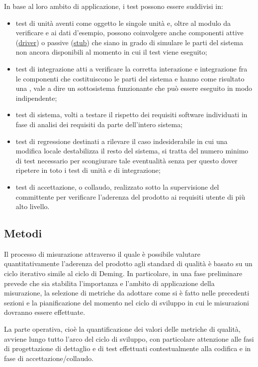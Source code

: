 In base al loro ambito di applicazione, i test possono essere suddivisi in:
\begin {itemize}
\item test di unità aventi come oggetto le singole unità e, oltre al modulo da verificare e ai dati d'esempio, possono coinvolgere anche componenti attive (\underline{driver}) o passive (\underline{stub}) che siano in grado di simulare le parti del sistema non ancora disponibili al momento in cui il test viene eseguito;

\item test di integrazione atti a verificare la corretta interazione e integrazione fra le componenti che costituiscono le parti del sistema e hanno come risultato una , vale a dire un sottosistema funzionante che può essere eseguito in modo indipendente;

\item test di sistema, volti a testare il rispetto dei requisiti software individuati in fase di analisi dei requisiti da parte dell'intero sistema;

\item test di regressione destinati a rilevare il caso indesiderabile in cui una modifica locale destabilizza il resto del sistema, si tratta del numero minimo di test necessario per scongiurare tale eventualità senza per questo dover ripetere in toto i test di unità e di integrazione;

\item test di accettazione, o collaudo, realizzato sotto la supervisione del committente per verificare l'aderenza del prodotto ai requisiti utente di più alto livello.

\end{itemize}

\subsection{Metodi}
Il processo di misurazione attraverso il quale è possibile valutare quantitativamente l'aderenza del prodotto agli standard di qualità è basato su un ciclo iterativo simile al ciclo di Deming. In particolare, in una fase preliminare prevede che sia stabilita l'importanza e l'ambito di applicazione della misurazione, la selezione di metriche da adottare come si è fatto nelle precedenti sezioni e la pianificazione del momento nel ciclo di sviluppo in cui le misurazioni dovranno essere effettuate.

La parte operativa, cioè la quantificazione dei valori delle metriche di qualità, avviene lungo tutto l'arco del ciclo di sviluppo, con particolare attenzione alle fasi di progettazione di dettaglio e di test effettuati contestualmente alla codifica e in fase di accettazione/collaudo.

